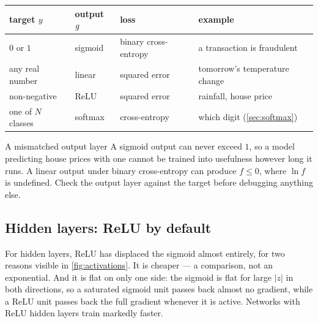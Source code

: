 \begin{center}
\small
\renewcommand{\arraystretch}{1.3}
\begin{tabular}{@{}L{3.0cm}L{2.0cm}L{3.2cm}L{3.0cm}@{}}
\toprule
target $y$ & output $g$ & loss & example\\
\midrule
$0$ or $1$ & sigmoid & binary cross-entropy & a transaction is fraudulent\\
any real number & linear & squared error & tomorrow's temperature change\\
non-negative & ReLU & squared error & rainfall, house price\\
one of $N$ classes & softmax & cross-entropy & which digit (\cref{sec:softmax})\\
\bottomrule
\end{tabular}
\end{center}

\begin{pitfall}{A mismatched output layer}
A sigmoid output can never exceed $1$, so a model predicting house prices with
one cannot be trained into usefulness however long it runs. A linear output
under binary cross-entropy can produce $f \le 0$, where $\ln f$ is undefined.
Check the output layer against the target before debugging anything else.
\end{pitfall}

\subsection{Hidden layers: ReLU by default}

For hidden layers, ReLU has displaced the sigmoid almost entirely, for two
reasons visible in \cref{fig:activations}. It is cheaper --- a comparison, not
an exponential. And it is flat on only one side: the sigmoid is flat for large
$|z|$ in both directions, so a saturated sigmoid unit passes back almost no
gradient, while a ReLU unit passes back the full gradient whenever it is active.
Networks with ReLU hidden layers train markedly faster.

